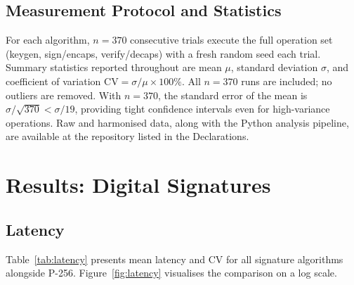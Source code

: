 \documentclass[iicol]{sn-jnl}
\begin{document}
\subsection{Measurement Protocol and Statistics}

For each algorithm, $n = 370$ consecutive trials execute the full
operation set (keygen, sign/encaps, verify/decaps) with a fresh
random seed each trial.
Summary statistics reported throughout are mean $\mu$, standard deviation
$\sigma$, and coefficient of variation $\text{CV} = \sigma/\mu \times 100\%$.
All $n = 370$ runs are included; no outliers are removed.
With $n = 370$, the standard error of the mean is $\sigma / \sqrt{370}
< \sigma / 19$, providing tight confidence intervals even for high-variance
operations.
Raw and harmonised data, along with the Python analysis pipeline, are
available at the repository listed in the Declarations.

\section{Results: Digital Signatures}
\label{sec:results-sigs}

\subsection{Latency}
\label{sec:latency}

Table~\ref{tab:latency} presents mean latency and CV for all signature
algorithms alongside P-256.
Figure~\ref{fig:latency} visualises the comparison on a log scale.
\end{document}
